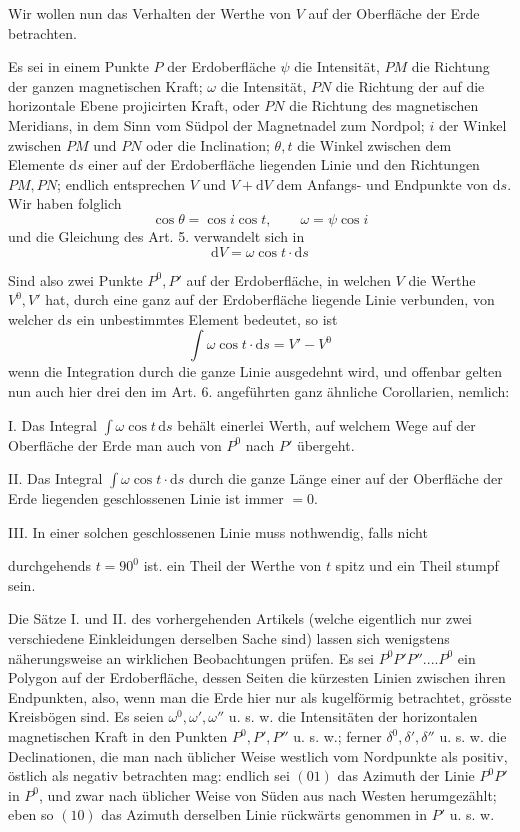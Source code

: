 Wir wollen nun das Verhalten der Werthe von $V$ auf der Oberfläche der Erde betrachten.

Es sei in einem Punkte $P$ der Erdoberfläche $\psi$ die Intensität, $PM$ die Richtung der ganzen magnetischen Kraft; $\omega$ die Intensität, $PN$ die Richtung der auf die horizontale Ebene projicirten Kraft, oder $PN$ die Richtung des magnetischen Meridians, in dem Sinn vom Südpol der Magnetnadel zum Nordpol; $i$ der Winkel zwischen $PM$ und $PN$ oder die Inclination; $\theta,t$ die Winkel zwischen dem Elemente $\mathrm{d}s$ einer auf der Erdoberfläche liegenden Linie und den Richtungen $PM,PN$; endlich entsprechen $V$ und $V+\mathrm{d}V$ dem Anfangs- und Endpunkte von $\mathrm{d}s$. Wir haben folglich
\[
\cos\theta=\cos i\cos t,\qquad \omega=\psi\cos i
\]
und die Gleichung des Art. 5. verwandelt sich in
\[
\mathrm{d}V=\omega\cos t\cdot\mathrm{d}s
\]

Sind also zwei Punkte $P^0,P'$ auf der Erdoberfläche, in welchen $V$ die Werthe $V^0,V'$ hat, durch eine ganz auf der Erdoberfläche liegende Linie verbunden, von welcher $\mathrm{d}s$ ein unbestimmtes Element bedeutet, so ist
\[
\int\omega\cos t\cdot\mathrm{d}s=V'-V^0
\]
wenn die Integration durch die ganze Linie ausgedehnt wird, und offenbar gelten nun auch hier drei den im Art. 6. angeführten ganz ähnliche Corollarien, nemlich:

I. Das Integral $\int\omega\cos t\,\mathrm{d}s$ behält einerlei Werth, auf welchem Wege auf der Oberfläche der Erde man auch von $P^0$ nach $P'$ übergeht.

II. Das Integral $\int\omega\cos t\cdot\mathrm{d}s$ durch die ganze Länge einer auf der Oberfläche der Erde liegenden geschlossenen Linie ist immer $=0$.

III. In einer solchen geschlossenen Linie muss nothwendig, falls nicht
\par\clearpage
{}
\noindent durchgehends $t=90^0$ ist. ein Theil der Werthe von $t$ spitz und ein Theil stumpf sein.

Die Sätze I. und II. des vorhergehenden Artikels (welche eigentlich nur zwei verschiedene Einkleidungen derselben Sache sind) lassen sich wenigstens näherungsweise an wirklichen Beobachtungen prüfen. Es sei $P^0P'P''....P^0$ ein Polygon auf der Erdoberfläche, dessen Seiten die kürzesten Linien zwischen ihren Endpunkten, also, wenn man die Erde hier nur als kugelförmig betrachtet, grösste Kreisbögen sind. Es seien $\omega^0,\omega',\omega''$ u. s. w. die Intensitäten der horizontalen magnetischen Kraft in den Punkten $P^0,P',P''$ u. s. w.; ferner $\delta^0,\delta',\delta''$ u. s. w. die Declinationen, die man nach üblicher Weise westlich vom Nordpunkte als positiv, östlich als negativ betrachten mag: endlich sei $(01)$ das Azimuth der Linie $P^0P'$ in $P^0$, und zwar nach üblicher Weise von Süden aus nach Westen herumgezählt; eben so $(10)$ das Azimuth derselben Linie rückwärts genommen in $P'$ u. s. w.

